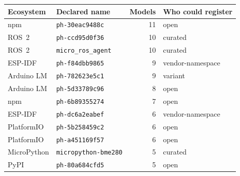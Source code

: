 \begin{tabular}{@{}llrl@{}}
\toprule
Ecosystem & Declared name & Models & Who could register \\
\midrule
npm & \texttt{ph-30eac9488c} & 11 & open \\
ROS~2 & \texttt{ph-ccd95d0f36} & 10 & curated \\
ROS~2 & \texttt{micro\_ros\_agent} & 10 & curated \\
ESP-IDF & \texttt{ph-f84dbb9865} & 9 & vendor-namespace \\
Arduino LM & \texttt{ph-782623e5c1} & 9 & variant \\
Arduino LM & \texttt{ph-5d33789c96} & 8 & open \\
npm & \texttt{ph-6b89355274} & 7 & open \\
ESP-IDF & \texttt{ph-dc6a2eabef} & 6 & vendor-namespace \\
PlatformIO & \texttt{ph-5b258459c2} & 6 & open \\
PlatformIO & \texttt{ph-a451169f57} & 6 & open \\
MicroPython & \texttt{micropython-bme280} & 5 & curated \\
PyPI & \texttt{ph-80a684cfd5} & 5 & open \\
\bottomrule
\end{tabular}
